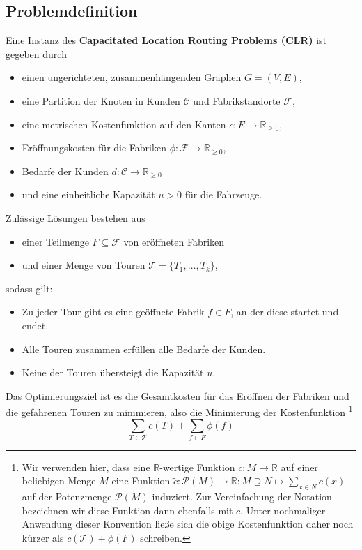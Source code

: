 \documentclass[a4paper,ngerman,11pt,bibtotoc]{scrartcl}
\theoremstyle{definition}
\theoremstyle{plain}
\theoremstyle{remark}
\newcommand{\IR}{\mathbb{R}}
\newcommand{\Tc}{\mathcal{T}}
\newcommand{\ClientSet}{\mathscr{C}}
\newcommand{\FacilitySet}{\mathscr{F}}
\newcommand{\CLR}{CLR}
\begin{document}
	\subsection{Problemdefinition}

Eine Instanz des \textbf{Capacitated Location Routing Problems (\CLR)} ist gegeben durch
\begin{itemize}
	\item einen ungerichteten, zusammenhängenden Graphen $G =(V,E)$,
	\item eine Partition der Knoten in Kunden $\ClientSet$ und Fabrikstandorte $\FacilitySet$,
	\item eine metrischen Kostenfunktion auf den Kanten $c: E \to \IR_{\geq 0}$,
	\item Eröffnungskosten für die Fabriken $\phi: \FacilitySet \to \IR_{\geq 0}$,
	\item Bedarfe der Kunden $d: \ClientSet \to \IR_{\geq 0}$
	\item und eine einheitliche Kapazität $u > 0$ für die Fahrzeuge.		
\end{itemize}
Zulässige Lösungen bestehen aus
\begin{itemize}
	\item einer Teilmenge $F \subseteq \FacilitySet$ von eröffneten Fabriken
	\item und einer Menge von Touren $\Tc = \{T_1, \dots, T_k\}$,
\end{itemize}
sodass gilt:
\begin{itemize}
	\item Zu jeder Tour gibt es eine geöffnete Fabrik $f \in F$, an der diese startet und endet.
	\item Alle Touren zusammen erfüllen alle Bedarfe der Kunden.
	\item Keine der Touren übersteigt die Kapazität $u$.
\end{itemize}
Das Optimierungsziel ist es die Gesamtkosten für das Eröffnen der Fabriken und die gefahrenen Touren zu minimieren, also die Minimierung der Kostenfunktion
\footnote{Wir verwenden hier, dass eine $\IR$-wertige Funktion $c: M \to \IR$ auf einer beliebigen Menge $M$ eine Funktion $\tilde{c}: \mathcal{P}(M) \to \IR: M \supseteq N \mapsto \sum_{x \in N} c(x)$ auf der Potenzmenge $\mathcal{P}(M)$ induziert. Zur Vereinfachung der Notation bezeichnen wir diese Funktion dann ebenfalls mit $c$. Unter nochmaliger Anwendung dieser Konvention ließe sich die obige Kostenfunktion daher noch kürzer als $c(\Tc) + \phi(F)$ schreiben.}
	\[\sum_{T\in\Tc} c(T) + \sum_{f\in F}\phi(f) \]
	
\end{document}
